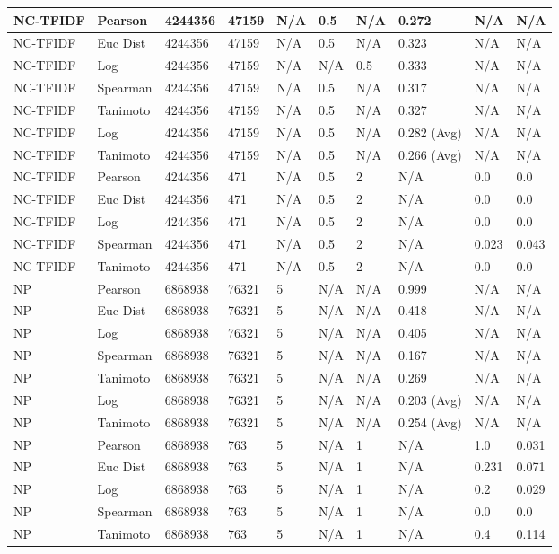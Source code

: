 \documentclass{article}
\begin{document}
\begin{longtable}{ |p{1.7cm}|p{1.9cm}|p{1.5cm}|p{1.5cm}|p{0.75cm}|p{0.75cm}|p{0.75cm}|p{0.75cm}|p{1.5cm}|p{1.5cm}|}
    NC-TFIDF & Pearson & 4244356 & 47159 & N/A & 0.5 & N/A & 0.272 & N/A & N/A  \\ \hline
    NC-TFIDF  & Euc Dist & 4244356 & 47159 & N/A & 0.5 & N/A & 0.323 & N/A & N/A   \\ \hline
    NC-TFIDF  & Log & 4244356 & 47159 & N/A &  N/A & 0.5 & 0.333 & N/A & N/A  \\ \hline
    NC-TFIDF  & Spearman & 4244356 & 47159 & N/A & 0.5 & N/A & 0.317 & N/A & N/A \\ \hline
    NC-TFIDF  & Tanimoto & 4244356 & 47159 & N/A & 0.5 & N/A & 0.327 & N/A & N/A \\ \hline
    NC-TFIDF  & Log & 4244356 & 47159 & N/A & 0.5 & N/A & 0.282 (Avg) & N/A & N/A \\ \hline
    NC-TFIDF  & Tanimoto & 4244356 & 47159 & N/A & 0.5 & N/A & 0.266 (Avg) & N/A & N/A \\ \hline
    
    NC-TFIDF  & Pearson & 4244356 & 471 & N/A & 0.5 & 2 & N/A & 0.0 & 0.0  \\ \hline
    NC-TFIDF  & Euc Dist & 4244356 & 471 & N/A & 0.5 & 2 & N/A &0.0 & 0.0   \\ \hline
    NC-TFIDF  & Log & 4244356 & 471 & N/A & 0.5 & 2 & N/A & 0.0 & 0.0  \\ \hline
    NC-TFIDF  & Spearman & 4244356 & 471 & N/A & 0.5 & 2 & N/A &0.023 & 0.043 \\ \hline
    NC-TFIDF  & Tanimoto & 4244356 & 471 & N/A & 0.5 & 2 & N/A & 0.0 & 0.0 \\ \hline
    
    NP & Pearson & 6868938 & 76321 & 5 &  N/A & N/A & 0.999 & N/A & N/A  \\ \hline
    NP & Euc Dist & 6868938 & 76321 & 5 & N/A & N/A & 0.418 & N/A & N/A   \\ \hline
    NP & Log & 6868938 & 76321 & 5 &  N/A & N/A & 0.405 & N/A & N/A  \\ \hline
    NP & Spearman & 6868938 & 76321 & 5 & N/A & N/A & 0.167 & N/A & N/A \\ \hline
    NP & Tanimoto & 6868938 & 76321 & 5 & N/A & N/A & 0.269 & N/A & N/A \\ \hline
    NP & Log & 6868938 & 76321 & 5 & N/A & N/A & 0.203 (Avg) & N/A & N/A \\ \hline
    NP & Tanimoto & 6868938 & 76321 & 5 & N/A & N/A & 0.254 (Avg) & N/A & N/A \\ \hline
    
    NP & Pearson & 6868938 & 763 & 5 &  N/A & 1 & N/A & 1.0 & 0.031  \\ \hline
    NP & Euc Dist & 6868938 & 763 & 5 & N/A & 1 & N/A &0.231 & 0.071   \\ \hline
    NP & Log & 6868938 & 763 & 5 &  N/A & 1 & N/A & 0.2 & 0.029  \\ \hline
    NP & Spearman & 6868938 & 763 & 5 & N/A & 1 & N/A &0.0 & 0.0 \\ \hline
    NP & Tanimoto & 6868938 & 763 & 5 & N/A & 1 & N/A & 0.4 & 0.114 \\ \hline
    

\end{longtable}
\end{document}
